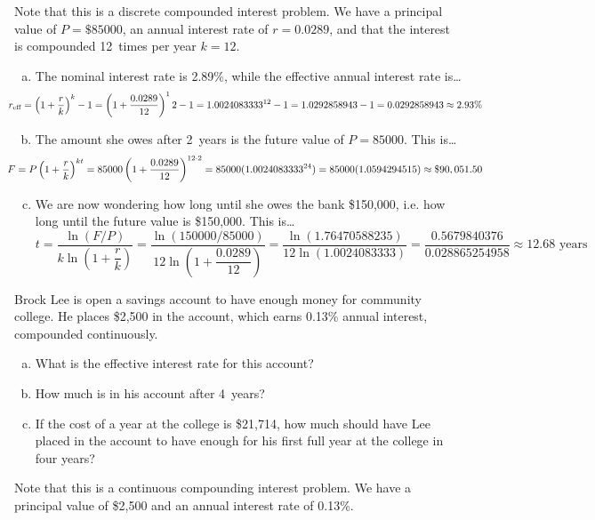 \documentclass[11pt,letterpaper]{article}
\begin{document}
\sol Note that this is a discrete compounded interest problem. We have a principal value of $P= \$85000$, an annual interest rate of $r= 0.0289$, and that the interest is compounded 12~times per year $k= 12$.

\begin{enumerate}[(a)]
\item The nominal interest rate is 2.89\%, while the effective annual interest rate is\dots
	\[
	\hspace{-1cm} r_{\text{eff}}= \left(1 + \dfrac{r}{k} \right)^k - 1= \left(1 + \dfrac{0.0289}{12} \right)^12 - 1= 1.0024083333^{12} - 1= 1.0292858943 - 1= 0.0292858943 \approx 2.93\%
	\] \pspace

\item The amount she owes after 2~years is the future value of $P= 85000$. This is\dots
	\[
	\hspace{-1cm} F= P \left(1 + \dfrac{r}{k} \right)^{kt}= 85000 \left(1 + \dfrac{0.0289}{12} \right)^{12 \cdot 2}= 85000(1.0024083333^{24})= 85000(1.0594294515) \approx \$90,051.50
	\] \pspace

\item We are now wondering how long until she owes the bank \$150,000, i.e. how long until the future value is \$150,000. This is\dots
	\[
	t= \dfrac{\ln(F/P)}{k \ln \left(1 + \dfrac{r}{k} \right)}= \dfrac{\ln(150000/85000)}{12 \ln \left(1 + \dfrac{0.0289}{12} \right)}= \dfrac{\ln(1.76470588235)}{12 \ln(1.0024083333)}= \dfrac{0.5679840376}{0.028865254958} \approx 12.68 \text{ years}
	\]
\end{enumerate}



\newpage



 Brock Lee is open a savings account to have enough money for community college. He places \$2,500 in the account, which earns 0.13\% annual interest, compounded continuously.
	\begin{enumerate}[(a)]
	\item What is the effective interest rate for this account?
	\item How much is in his account after 4~years?
	\item If the cost of a year at the college is \$21,714, how much should have Lee placed in the account to have enough for his first full year at the college in four years?
	\end{enumerate} \pspace

\sol Note that this is a continuous compounding interest problem. We have a principal value of \$2,500 and an annual interest rate of 0.13\%. 
\end{document}
